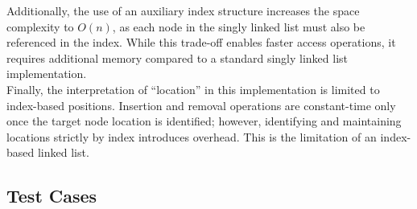 \documentclass[12pt]{article}
\begin{document}
Additionally, the use of an auxiliary index structure increases the space complexity to $O(n)$, as each node in the singly linked list must also be referenced in the index. While this trade-off enables faster access operations, it requires additional memory compared to a standard singly linked list implementation.\\

Finally, the interpretation of ``location'' in this implementation is limited to index-based positions. Insertion and removal operations are constant-time only once the target node location is identified; however, identifying and maintaining locations strictly by index introduces overhead. This is the limitation of an index-based linked list.

\subsection{Test Cases}
\end{document}
